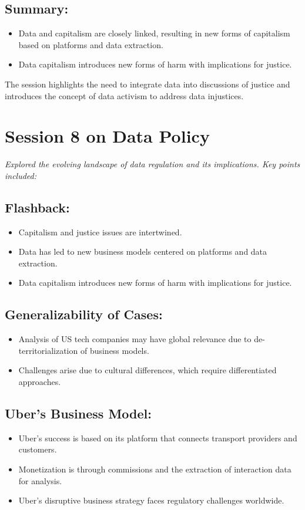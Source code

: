 \documentclass{article}
\begin{document}
\subsection*{Summary:}
\begin{itemize}
    \item Data and capitalism are closely linked, resulting in new forms of capitalism based on platforms and data extraction.
    \item Data capitalism introduces new forms of harm with implications for justice.
\end{itemize}

The session highlights the need to integrate data into discussions of justice and introduces the concept of data activism to address data injustices.


\section*{Session 8 on Data Policy}
\textit{Explored the evolving landscape of data regulation and its implications. Key points included:}

\subsection*{Flashback:}
\begin{itemize}
    \item Capitalism and justice issues are intertwined.
    \item Data has led to new business models centered on platforms and data extraction.
    \item Data capitalism introduces new forms of harm with implications for justice.
\end{itemize}

\subsection*{Generalizability of Cases:}
\begin{itemize}
    \item Analysis of US tech companies may have global relevance due to de-territorialization of business models.
    \item Challenges arise due to cultural differences, which require differentiated approaches.
\end{itemize}

\subsection*{Uber's Business Model:}
\begin{itemize}
    \item Uber's success is based on its platform that connects transport providers and customers.
    \item Monetization is through commissions and the extraction of interaction data for analysis.
    \item Uber's disruptive business strategy faces regulatory challenges worldwide.
\end{itemize}
\end{document}

